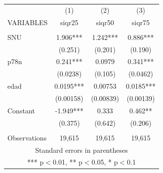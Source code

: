 \begin{tabular}{lccc} \hline
 & (1) & (2) & (3) \\
VARIABLES & siqr25 & siqr50 & siqr75 \\ \hline
 &  &  &  \\
SNU & 1.906*** & 1.242*** & 0.886*** \\
 & (0.251) & (0.201) & (0.190) \\
p78n & 0.241*** & 0.0979 & 0.341*** \\
 & (0.0238) & (0.105) & (0.0462) \\
edad & 0.0195*** & 0.00753 & 0.0185*** \\
 & (0.00158) & (0.00839) & (0.00139) \\
Constant & -1.949*** & 0.333 & 0.462** \\
 & (0.375) & (0.642) & (0.206) \\
 &  &  &  \\
 Observations & 19,615 & 19,615 & 19,615 \\ \hline
\multicolumn{4}{c}{ Standard errors in parentheses} \\
\multicolumn{4}{c}{ *** p$<$0.01, ** p$<$0.05, * p$<$0.1} \\
\end{tabular}
